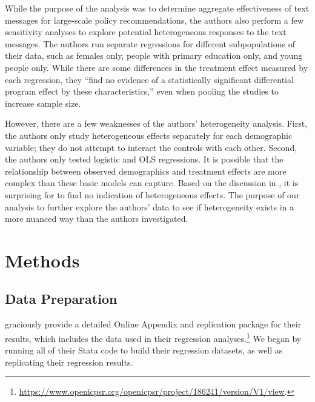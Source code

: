\documentclass[12pt]{article}
\begin{document}
While the purpose of the \textcite{fabregas_digital_2025} analysis was to determine aggregate effectiveness of text messages for large-scale policy recommendations, the authors also perform a few sensitivity analyses to explore potential heterogeneous responses to the text messages. The authors run separate regressions for different subpopulations of their data, such as females only, people with primary education only, and young people only. While there are some differences in the treatment effect measured by each regression, they ``find no evidence of a statistically significant differential program effect by these characteristics,'' even when pooling the studies to increase sample size. 

However, there are a few weaknesses of the authors' heterogeneity analysis. First, the authors only study heterogeneous effects separately for each demographic variable; they do not attempt to interact the controls with each other. Second, the authors only tested logistic and OLS regressions. It is possible that the relationship between observed demographics and treatment effects are more complex than these basic models can capture. Based on the discussion in \textcite{aker_promise_2016}, it is surprising for \textcite{fabregas_digital_2025} to find no indication of heterogeneous effects. The purpose of our analysis to further explore the authors' data to see if heterogeneity exists in a more nuanced way than the authors investigated.

\section{Methods}
\label{section:methods}

\subsection{Data Preparation}
\textcite{fabregas_digital_2025} graciously provide a detailed Online Appendix and replication package for their results, which includes the data used in their regression analyses.\footnote{\url{https://www.openicpsr.org/openicpsr/project/186241/version/V1/view}.} We began by running all of their Stata code to build their regression datasets, as well as replicating their regression results.
\end{document}
